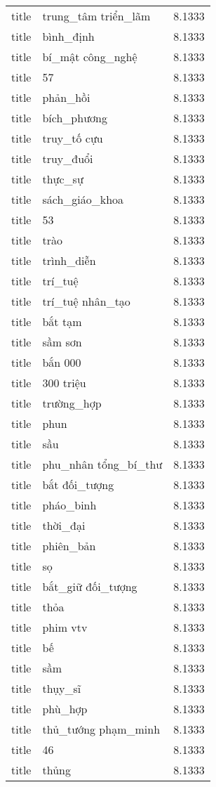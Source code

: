 \documentclass{article}
\begin{document}
\begin{tabular}{lll}
title & trung\_tâm triển\_lãm & 8.1333\\
title & bình\_định & 8.1333\\
title & bí\_mật công\_nghệ & 8.1333\\
title & 57 & 8.1333\\
title & phản\_hồi & 8.1333\\
title & bích\_phương & 8.1333\\
title & truy\_tố cựu & 8.1333\\
title & truy\_đuổi & 8.1333\\
title & thực\_sự & 8.1333\\
title & sách\_giáo\_khoa & 8.1333\\
title & 53 & 8.1333\\
title & trào & 8.1333\\
title & trình\_diễn & 8.1333\\
title & trí\_tuệ & 8.1333\\
title & trí\_tuệ nhân\_tạo & 8.1333\\
title & bắt tạm & 8.1333\\
title & sầm sơn & 8.1333\\
title & bắn 000 & 8.1333\\
title & 300 triệu & 8.1333\\
title & trường\_hợp & 8.1333\\
title & phun & 8.1333\\
title & sầu & 8.1333\\
title & phu\_nhân tổng\_bí\_thư & 8.1333\\
title & bắt đối\_tượng & 8.1333\\
title & pháo\_binh & 8.1333\\
title & thời\_đại & 8.1333\\
title & phiên\_bản & 8.1333\\
title & sọ & 8.1333\\
title & bắt\_giữ đối\_tượng & 8.1333\\
title & thỏa & 8.1333\\
title & phim vtv & 8.1333\\
title & bế & 8.1333\\
title & sầm & 8.1333\\
title & thụy\_sĩ & 8.1333\\
title & phù\_hợp & 8.1333\\
title & thủ\_tướng phạm\_minh & 8.1333\\
title & 46 & 8.1333\\
title & thủng & 8.1333\\

\end{tabular}
\end{document}
